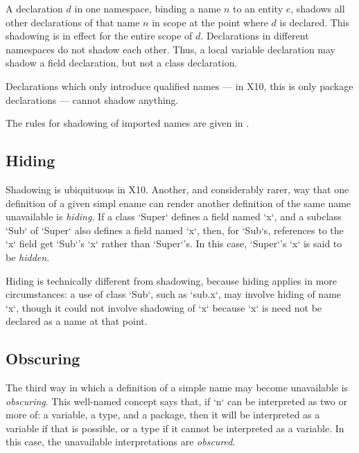 A declaration $d$ in one namespace, binding a name $n$ to an entity $e$,
shadows all other declarations of that name $n$ in scope at the point where
$d$ is declared. This shadowing is in effect for the entire scope of $d$.  
Declarations in different namespaces do not shadow each other.
Thus, a local variable declaration may shadow a field declaration, but not a
class declaration.

Declarations which only introduce qualified names --- in X10, this is only
package declarations --- cannot shadow anything.

The rules for shadowing of imported names are given in .

\subsection{Hiding}
\label{sect:Hiding}

Shadowing is ubiquituous in X10. Another, and considerably rarer, way that one
definition of a given simpl ename can render another definition of the same
name unavailable is {\em hiding}. If a class \xcd`Super` defines a field named
\xcd`x`, and a subclass \xcd`Sub` of \xcd`Super` also defines a field named
\xcd`x`, then, for \xcd`Sub`s, references to the \xcd`x` field get \xcd`Sub`'s
\xcd`x` rather than \xcd`Super`'s. In this case, \xcd`Super`'s \xcd`x` is said
to be {\em hidden}.

Hiding is technically different from shadowing, because hiding applies in more
circumstances: a use of class \xcd`Sub`, such as \xcd`sub.x`, may involve
hiding of name \xcd`x`, though it could not involve shadowing of \xcd`x`
because \xcd`x` is need not be declared as a name at that point.

\subsection{Obscuring}
\label{sect:Obscuring}

The third way in which a definition of a simple name may become unavailable is
{\em obscuring}. This well-named concept says that, if \xcd`n` can be
interpreted as two or more of: a variable, a type, and a package, then it will
be interpreted as a variable if that is possible, or a type if it cannot be
interpreted as a variable. In this case, the unavailable interpretations are
{\em obscured}. 

